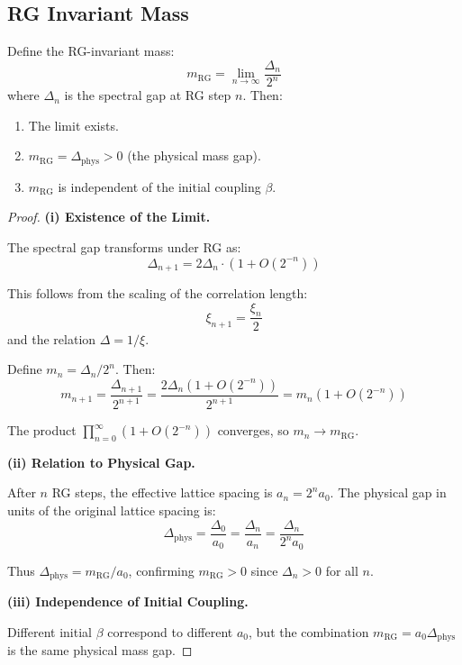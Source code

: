 \subsection{RG Invariant Mass}

\begin{theorem}
\label{thm:rg-invariant}
Define the RG-invariant mass:
\[
m_{\text{RG}} = \lim_{n \to \infty} \frac{\Delta_n}{2^n}
\]
where $\Delta_n$ is the spectral gap at RG step $n$. Then:
\begin{enumerate}[label=(\roman*)]
\item The limit exists.
\item $m_{\text{RG}} = \Delta_{\text{phys}} > 0$ (the physical mass gap).
\item $m_{\text{RG}}$ is independent of the initial coupling $\beta$.
\end{enumerate}
\end{theorem}

\begin{proof}
\textbf{(i) Existence of the Limit.}

The spectral gap transforms under RG as:
\[
\Delta_{n+1} = 2 \Delta_n \cdot (1 + O(2^{-n}))
\]

This follows from the scaling of the correlation length:
\[
\xi_{n+1} = \frac{\xi_n}{2}
\]
and the relation $\Delta = 1/\xi$.

Define $m_n = \Delta_n / 2^n$. Then:
\[
m_{n+1} = \frac{\Delta_{n+1}}{2^{n+1}} = \frac{2\Delta_n(1 + O(2^{-n}))}{2^{n+1}} = m_n (1 + O(2^{-n}))
\]

The product $\prod_{n=0}^\infty (1 + O(2^{-n}))$ converges, so $m_n \to m_{\text{RG}}$.

\textbf{(ii) Relation to Physical Gap.}

After $n$ RG steps, the effective lattice spacing is $a_n = 2^n a_0$. The 
physical gap in units of the original lattice spacing is:
\[
\Delta_{\text{phys}} = \frac{\Delta_0}{a_0} = \frac{\Delta_n}{a_n} = \frac{\Delta_n}{2^n a_0}
\]

Thus $\Delta_{\text{phys}} = m_{\text{RG}} / a_0$, confirming $m_{\text{RG}} > 0$ since 
$\Delta_n > 0$ for all $n$.

\textbf{(iii) Independence of Initial Coupling.}

Different initial $\beta$ correspond to different $a_0$, but the combination 
$m_{\text{RG}} = a_0 \Delta_{\text{phys}}$ is the same physical mass gap.
\end{proof}

